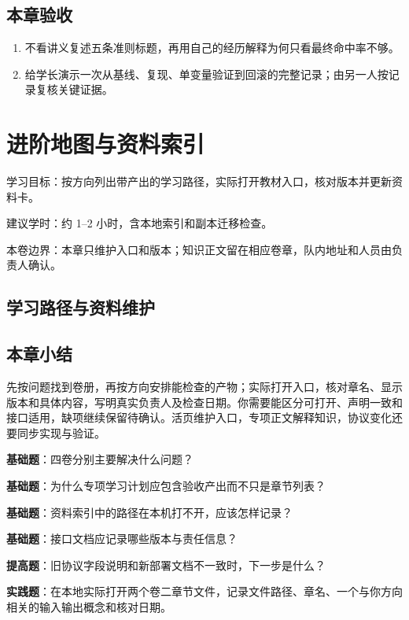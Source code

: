 \documentclass[
  lang=cn,
  scheme=chinese,
  chinesefont=ctexfont,
  11pt,
  oneside,
  device=normal,
  color=cyan,
  mode=fancy
]{elegantbook}
\begin{document}
\section{本章验收}
\begin{enumerate}
  \item 不看讲义复述五条准则标题，再用自己的经历解释为何只看最终命中率不够。
  \item 给学长演示一次从基线、复现、单变量验证到回滚的完整记录；由另一人按记录复核关键证据。
\end{enumerate}

\chapter{进阶地图与资料索引}
\begin{introduction}
  \item 学习目标：按方向列出带产出的学习路径，实际打开教材入口，核对版本并更新资料卡。
  \item 建议学时：约 1--2 小时，含本地索引和副本迁移检查。
  \item 本卷边界：本章只维护入口和版本；知识正文留在相应卷章，队内地址和人员由负责人确认。
\end{introduction}
\label{ch:v3-index}

\section{学习路径与资料维护}

\section{本章小结}
\begin{conclusion}
先按问题找到卷册，再按方向安排能检查的产物；实际打开入口，核对章名、显示版本和具体内容，写明真实负责人及检查日期。你需要能区分可打开、声明一致和接口适用，缺项继续保留待确认。活页维护入口，专项正文解释知识，协议变化还要同步实现与验证。
\end{conclusion}

\begin{problemset}
\item \label{v3-prob-index-1}\textbf{基础题}：四卷分别主要解决什么问题？
\item \label{v3-prob-index-2}\textbf{基础题}：为什么专项学习计划应包含验收产出而不只是章节列表？
\item \label{v3-prob-index-3}\textbf{基础题}：资料索引中的路径在本机打不开，应该怎样记录？
\item \label{v3-prob-index-4}\textbf{基础题}：接口文档应记录哪些版本与责任信息？
\item \label{v3-prob-index-5}\textbf{提高题}：旧协议字段说明和新部署文档不一致时，下一步是什么？
\item \label{v3-prob-index-6}\textbf{实践题}：在本地实际打开两个卷二章节文件，记录文件路径、章名、一个与你方向相关的输入输出概念和核对日期。
\end{problemset}
\end{document}

